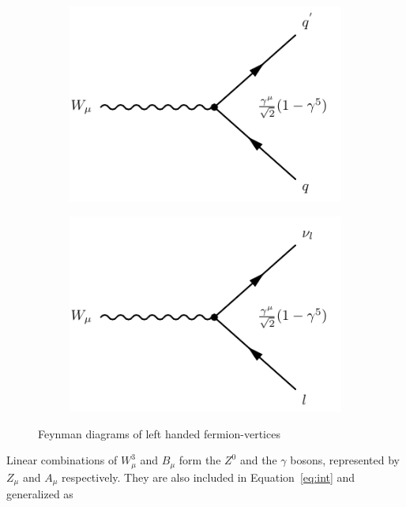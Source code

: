\begin{figure}[!h]
\begin{subfigure}{0.5\textwidth}
   \includegraphics[width=\textwidth]{figures/wqq.pdf}
\end{subfigure} %
\begin{subfigure}{0.5\textwidth}
   \includegraphics[width=\textwidth]{figures/wlep.pdf}
\end{subfigure}
\caption{Feynman diagrams of left handed fermion-\Wpm vertices}
\label{fig:fermWvet}
\end{figure}

Linear combinations of $W_\mu^3$ and $B_\mu$ form the $Z^0$ and the $\gamma$ bosons, represented 
by $Z_\mu$ and $A_\mu$ respectively. They are also included in 
Equation~\ref{eq:int} and generalized as 


